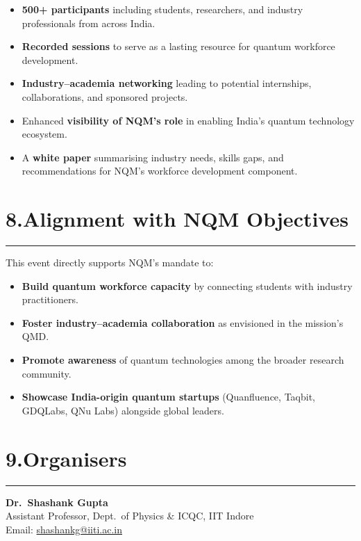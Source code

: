 \documentclass[12pt,a4paper]{article}
\begin{document}
\begin{itemize}
  \item \textbf{500+ participants} including students, researchers, and industry professionals from across India.
  \item \textbf{Recorded sessions} to serve as a lasting resource for quantum workforce development.
  \item \textbf{Industry--academia networking} leading to potential internships, collaborations, and sponsored projects.
  \item Enhanced \textbf{visibility of NQM's role} in enabling India's quantum technology ecosystem.
  \item A \textbf{white paper} summarising industry needs, skills gaps, and recommendations for NQM's workforce development component.
\end{itemize}

\section*{8.\quad Alignment with NQM Objectives}
\vspace{-4pt}\hrule\vspace{6pt}

This event directly supports NQM's mandate to:
\begin{itemize}
  \item \textbf{Build quantum workforce capacity} by connecting students with industry practitioners.
  \item \textbf{Foster industry--academia collaboration} as envisioned in the mission's QMD.
  \item \textbf{Promote awareness} of quantum technologies among the broader research community.
  \item \textbf{Showcase India-origin quantum startups} (Quanfluence, Taqbit, GDQLabs, QNu Labs) alongside global leaders.
\end{itemize}

\section*{9.\quad Organisers}
\vspace{-4pt}\hrule\vspace{6pt}

\noindent\textbf{Dr.\ Shashank Gupta}\\
Assistant Professor, Dept.\ of Physics \& ICQC, IIT Indore\\
Email: \href{mailto:shashankg@iiti.ac.in}{shashankg@iiti.ac.in}
\end{document}
